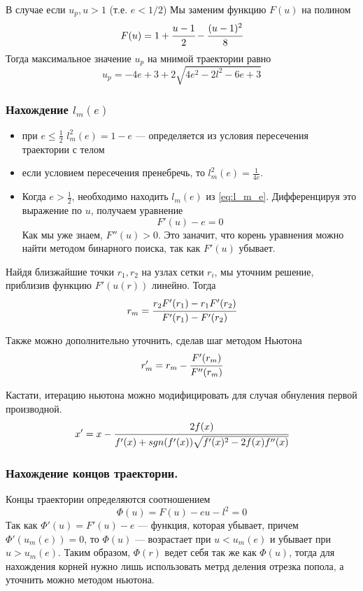 \documentclass[a4paper, 14pt]{article}
\begin{document}
	В случае если $u_p, u > 1$ (т.е. $e < 1/2$) Мы заменим функцию $F(u)$ на полином
	\begin{equation*}
		F(u) = 1 + \cfrac{u-1}{2}-\cfrac{(u-1)^2}{8}
	\end{equation*}
	Тогда максимальное значение $u_p$ на мнимой траектории равно
	\begin{equation*}
		u_p = -4e + 3 + 2\sqrt{4e^2 - 2l^2 - 6e + 3}
	\end{equation*}
	
	
	
	\subsubsection{Нахождение $l_m(e)$}
	\begin{itemize}
		\item при $e \le \frac{1}{2}$ $l_m^2(e) = 1-e$ --- определяется из условия пересечения траектории с телом
		\item если условием пересечения пренебречь, то $l_m^2(e) = \frac{1}{4e}$. 
		\item Когда $e > \frac{1}{2}$, необходимо находить $l_m(e)$ из \ref{eq:l_m_e}.
		Дифференцируя это выражение по $u$, получаем уравнение 
		\begin{equation*}
			F'(u) - e = 0
		\end{equation*}
		Как мы уже знаем, $F''(u) > 0$. Это заначит, что корень уравнения можно найти методом бинарного поиска, так как $F'(u)$ убывает.
	
	\end{itemize}
	Найдя близжайшие точки $r_1, r_2$ на узлах сетки $r_i$, мы уточним решение, приблизив функцию $F'(u(r))$ линейно. Тогда 
	\begin{equation*}
		r_m = \cfrac{r_2 F'(r_1) - r_1 F'(r_2)}{F'(r_1)-F'(r_2)}
	\end{equation*}
	
	Также можно дополнительно уточнить, сделав шаг методом Ньютона
	\begin{equation*}
		r'_m = r_m - \cfrac{F'(r_m)}{F''(r_m)}
	\end{equation*}
	
	Кастати, итерацию ньютона можно модифицировать для случая обнуления первой производной.
	\begin{equation*}
		x' = x - \cfrac{2f(x)}
		{f'(x) +sgn(f'(x))\sqrt{f'(x)^2 - 2f(x)f''(x)} }
	\end{equation*}
		
	\subsubsection{Нахождение концов траектории.}
	Концы траектории определяются соотношением
	\begin{equation*}
		\Phi(u) = F(u) - eu-l^2=0
	\end{equation*}
	Так как $\Phi'(u) = F'(u) - e$ --- функция, которая убывает, причем $\Phi'(u_m(e)) = 0$, то $\Phi(u)$ --- возрастает при $u < u_m(e)$ и убывает при $u > u_m(e)$.
	Таким образом, $\Phi(r)$ ведет себя так же как $\Phi(u)$, тогда для нахождения корней нужно лишь использовать метрд деления отрезка попола, а уточнить можно методом ньютона. 
	
\end{document}
